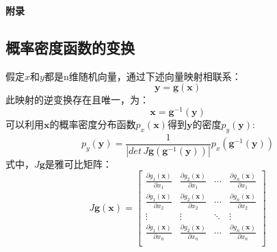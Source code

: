 \documentclass[UTF8,zihao=5,a4paper]{ctexart}
\begin{document}
\newpage
{\LARGE{\textbf{附录}}}
\begin{appendix}
\section{概率密度函数的变换}\label{apx:1}
假定$x$和$y$都是n维随机向量，通过下述向量映射相联系：
\[
    \mathbf{y}=\mathbf{g}(\mathbf{x})
\]
此映射的逆变换存在且唯一，为：
\[
    \mathbf{x}=\mathbf{g}^{-1}(\mathbf{y})
\]
可以利用$\mathbf{x}$的概率密度分布函数$p_x(\mathbf{x})$得到$\mathbf{y}$的密度$p_y(\mathbf{y})$:
\[
    p_y(\mathbf{y})=
    \frac{1}{| det\,\mathit{J}\mathbf{g}(\mathbf{g}^{-1}(\mathbf{y}) ) |}
    p_x(\mathbf{g}^{-1}(\mathbf{y}))
\]
式中，$\mathit{J}\mathbf{g}$是雅可比矩阵：
\[
    \mathit{J}\mathbf{g}(\mathbf{x})=\left[
    \begin{array}{cccc}
    \frac{\partial g_1(\mathbf{x})}{\partial x_1}&  \frac{\partial g_2(\mathbf{x})}{\partial x_1}&  \cdots&  \frac{\partial g_n(\mathbf{x})}{\partial x_1}\\ 
    \frac{\partial g_1(\mathbf{x})}{\partial x_2}&  \frac{\partial g_2(\mathbf{x})}{\partial x_2}&  \cdots&  \frac{\partial g_n(\mathbf{x})}{\partial x_2}\\ 
    \vdots&  \vdots&  \ddots&  \vdots\\ 
    \frac{\partial g_1(\mathbf{x})}{\partial x_n}&  \frac{\partial g_2(\mathbf{x})}{\partial x_n}&  \cdots&  \frac{\partial g_n(\mathbf{x})}{\partial x_n}\\ 
    \end{array} 
    \right]
\]
\end{appendix}
\end{document}
